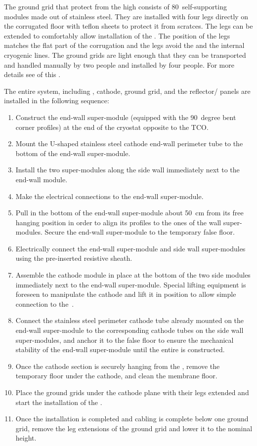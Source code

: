 The ground grid that protect  from the high \efield consists of 80~self-supporting modules made out of stainless steel.
They are installed with four legs directly on the corrugated floor with teflon sheets to protect it from scratces.
The legs can be extended to comfortably allow installation of the .
The position of the legs matches the flat part of the corrugation and the legs avoid the  and the internal cryogenic lines.
The ground grids are light enough that they can be transported and handled manually by two people and installed by four people.
For more details see \dpchhv of this .

The entire  system, including , cathode, ground grid, and the reflector/ panels are installed in the following sequence:
\begin{enumerate}
\item Construct the end-wall super-module (equipped with the 90~degree bent corner profiles) at the end of the cryostat opposite to the TCO.
\item Mount the U-shaped stainless steel cathode end-wall perimeter tube to the bottom of the end-wall super-module.
\item Install the two super-modules along the side wall immediately next to the end-wall module.
\item Make the electrical connections to the end-wall super-module.
\item Pull in the bottom of the end-wall super-module about 50~cm from its free hanging position in order to align its profiles to the ones of the wall  super-modules. Secure the end-wall super-module to the temporary false floor.
\item Electrically connect the end-wall super-module and side wall super-modules using the pre-inserted resistive sheath.
\item Assemble the cathode module in place at the bottom of the two side  modules immediately next to the end-wall super-module.
Special lifting equipment is foreseen to manipulate the cathode and lift it in position to allow simple connection to the~.
\item Connect the stainless steel perimeter cathode tube already mounted on the end-wall super-module to the corresponding cathode tubes on the side wall super-modules, and anchor it to the false floor to ensure the mechanical stability of the end-wall super-module until the entire  is constructed.
\item Once the cathode section is securely hanging from the , remove the temporary floor under the cathode, and clean the membrane floor.
\item Place the ground grids under the cathode plane with their legs extended and start the installation of the .
\item Once the  installation is completed and cabling is complete below one ground grid, remove the leg extensions of the ground grid and lower it to the nominal height.
\end{enumerate}
